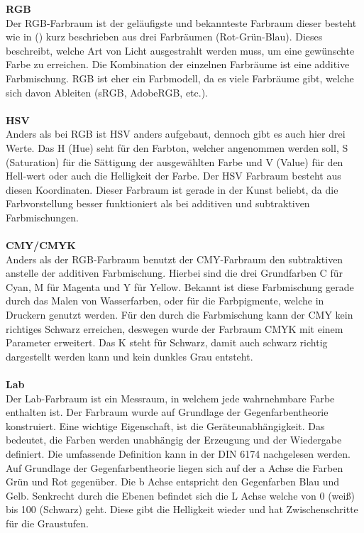 \documentclass[a4paper,12pt,oneside]{article}
\begin{document}
\textbf{RGB}\label{s.rgb}\\
Der RGB-Farbraum ist der geläufigste und bekannteste Farbraum dieser besteht wie in () kurz beschrieben aus drei Farbräumen (Rot-Grün-Blau). Dieses beschreibt, welche Art von Licht ausgestrahlt werden muss, um eine gewünschte Farbe zu erreichen. Die Kombination der einzelnen Farbräume ist eine additive Farbmischung. RGB ist eher ein Farbmodell, da es viele Farbräume gibt, welche sich davon Ableiten (sRGB, AdobeRGB, etc.).\\\\
\textbf{HSV}\label{s.hsv}\\
Anders als bei RGB ist HSV anders aufgebaut, dennoch gibt es auch hier drei Werte. Das H (Hue) seht für den Farbton, welcher angenommen werden soll, S (Saturation) für die Sättigung der ausgewählten Farbe und V (Value) für den Hell-wert oder auch die Helligkeit der Farbe. Der HSV Farbraum besteht aus diesen Koordinaten. Dieser Farbraum ist gerade in der Kunst beliebt, da die Farbvorstellung besser funktioniert als bei additiven und subtraktiven Farbmischungen.\\\\
\textbf{CMY/CMYK}\label{s.cmy}\\
Anders als der RGB-Farbraum benutzt der CMY-Farbraum den subtraktiven anstelle der additiven Farbmischung. Hierbei sind die drei Grundfarben C für Cyan, M für Magenta und Y für Yellow. Bekannt ist diese Farbmischung gerade durch das Malen von Wasserfarben, oder für die Farbpigmente, welche in Druckern genutzt werden. Für den durch die Farbmischung kann der CMY kein richtiges Schwarz erreichen, deswegen wurde der Farbraum CMYK mit einem Parameter erweitert. Das K steht für Schwarz, damit auch schwarz richtig dargestellt werden kann und kein dunkles Grau entsteht.\\\\
\textbf{Lab}\label{s.lab}\\
Der Lab-Farbraum ist ein Messraum, in welchem jede wahrnehmbare Farbe enthalten ist. Der Farbraum wurde auf Grundlage der Gegenfarbentheorie konstruiert. Eine wichtige Eigenschaft, ist die Geräteunabhängigkeit. Das bedeutet, die Farben werden unabhängig der Erzeugung und der Wiedergabe definiert. Die umfassende Definition kann in der DIN 6174 nachgelesen werden. Auf Grundlage der Gegenfarbentheorie liegen sich auf der a Achse die Farben Grün und Rot gegenüber. Die b Achse entspricht den Gegenfarben Blau und Gelb. Senkrecht durch die Ebenen befindet sich die L Achse welche von 0 (weiß) bis 100 (Schwarz) geht. Diese gibt die Helligkeit wieder und hat Zwischenschritte für die Graustufen.
\end{document}
